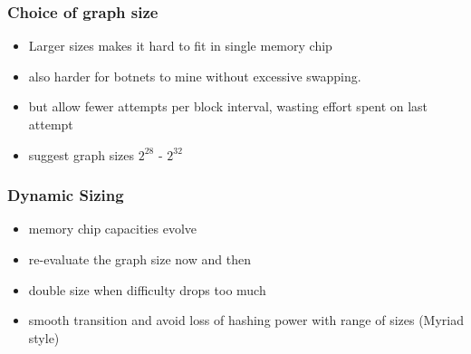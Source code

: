 \documentclass{beamer}
\begin{document}
\begin{frame}
\frametitle{Choice of graph size}
\begin{itemize}
\item Larger sizes makes it hard to fit in single memory chip
\pause
\item also harder for botnets to mine without excessive swapping.
\pause
\item but allow fewer attempts per block interval, wasting effort spent on last attempt
\pause
\item suggest graph sizes $2^{28}$ - $2^{32}$
\end{itemize}
\end{frame}

\begin{frame}
\frametitle{Dynamic Sizing}
\begin{itemize}
\item memory chip capacities evolve
\pause
\item
re-evaluate the graph size now and then
\pause
\item
double size when difficulty drops too much
\item smooth transition and avoid loss of hashing power
  with range of sizes (Myriad style)


\end{itemize}
\end{frame}
\end{document}
